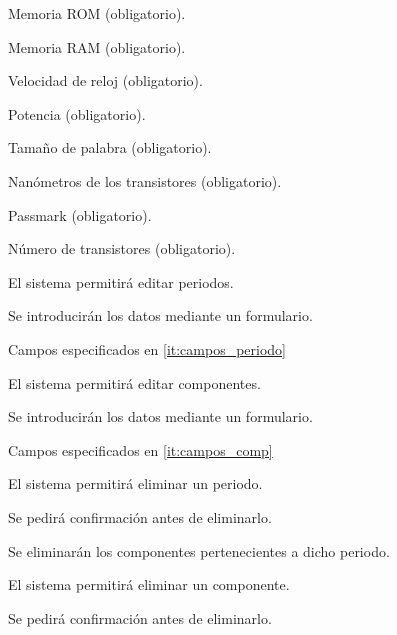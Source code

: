 \begin{myEnumRFA}
\begin{myEnumRFA}
\begin{myEnumRFA}
\begin{myEnumRFA}
\begin{myEnumRFA}
					\item Memoria ROM (obligatorio).
					\item Memoria RAM (obligatorio).
					\item Velocidad de reloj (obligatorio).
					\item Potencia (obligatorio).
					\item Tamaño de palabra (obligatorio).
					\item Nanómetros de los transistores (obligatorio).
					\item Passmark (obligatorio).
					\item Número de transistores (obligatorio).
				\end{myEnumRFA}
			\end{myEnumRFA}
		\end{myEnumRFA}
	\end{myEnumRFA}
	\item El sistema permitirá editar periodos.
	\begin{myEnumRFA}
		\item Se introducirán los datos mediante un formulario.
		\begin{myEnumRFA}
			\item Campos especificados en \ref{it:campos_periodo}
		\end{myEnumRFA}
	\end{myEnumRFA}
	\item El sistema permitirá editar componentes.
	\begin{myEnumRFA}
		\item Se introducirán los datos mediante un formulario.
		\begin{myEnumRFA}
			\item Campos especificados en \ref{it:campos_comp}
		\end{myEnumRFA}
	\end{myEnumRFA}
	\item El sistema permitirá eliminar un periodo.
	\begin{myEnumRFA}
		\item Se pedirá confirmación antes de eliminarlo.
		\item Se eliminarán los componentes pertenecientes a dicho periodo.
	\end{myEnumRFA}
	\item El sistema permitirá eliminar un componente.
	\begin{myEnumRFA}
		\item Se pedirá confirmación antes de eliminarlo.
	\end{myEnumRFA}
\end{myEnumRFA}


